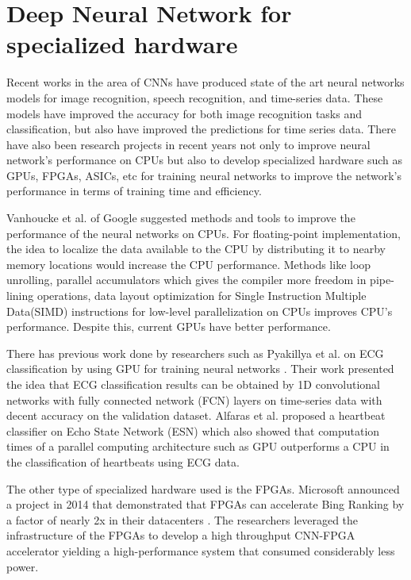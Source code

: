 \section{Deep Neural Network for specialized hardware}
\label{sec:DNN_for_specialized_hardware}

Recent works in the area of CNNs have produced state of the art neural networks models for image recognition, speech recognition, and time-series data. These models have improved the accuracy for both image recognition tasks and classification, but also have improved the predictions for time series data. There have also been research projects in recent years not only to improve neural network's performance on CPUs but also to develop specialized hardware such as GPUs, FPGAs, ASICs, etc for training neural networks to improve the network's performance in terms of training time and efficiency.

Vanhoucke et al. of Google \cite{vanhoucke2011improving} suggested methods and tools to improve the performance of the neural networks on CPUs. For floating-point implementation, the idea to localize the data available to the CPU by distributing it to nearby memory locations would increase the CPU performance. Methods like loop unrolling, parallel accumulators which gives the compiler more freedom in pipe-lining operations, data layout optimization for Single Instruction Multiple Data(SIMD) instructions for low-level parallelization on CPUs improves CPU's performance. Despite this, current GPUs have better performance.

There has previous work done by researchers such as Pyakillya et al. on ECG classification by using GPU for training neural networks \cite{pyakillya2017deep}. Their work presented the idea that ECG classification results can be obtained by 1D convolutional networks with fully connected network (FCN) layers on time-series data with decent accuracy on the validation dataset. Alfaras et al. proposed a heartbeat classifier on Echo State Network (ESN) \cite{alfaras2019fast} which also showed that computation times of a parallel computing architecture such as GPU outperforms a CPU in the classification of heartbeats using ECG data.

The other type of specialized hardware used is the FPGAs. Microsoft announced a project in 2014 that demonstrated that FPGAs can accelerate Bing Ranking by a factor of nearly 2x in their datacenters \cite{ovtcharov2015accelerating}. The researchers leveraged the infrastructure of the FPGAs to develop a high throughput CNN-FPGA accelerator yielding a high-performance system that consumed considerably less power. 

